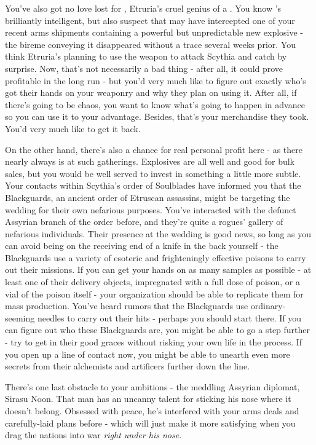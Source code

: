 \documentclass[char]{Kos}
\begin{document}
You've also got no love lost for \cEtruriaKing{}, Etruria's cruel genius of a \cEtruriaKing{\monarch}. You know \cEtruriaKing{\they}'s brilliantly intelligent, but also suspect that \cEtruriaKing{\they} may have intercepted one of your recent arms shipments containing a powerful but unpredictable new explosive - the bireme conveying it disappeared without a trace several weeks prior. You think Etruria's planning to use the weapon to attack Scythia and catch \cScythiaKing{} by surprise. Now, that's not necessarily a bad thing - after all, it could prove profitable in the long run - but you'd very much like to figure out exactly who's got their hands on your weaponry and why they plan on using it. After all, if there's going to be chaos, you want to know what's going to happen in advance so you can use it to your advantage. Besides, that's your merchandise they took. You'd very much like to get it back.

On the other hand, there's also a chance for real personal profit here - as there nearly always is at such gatherings. Explosives are all well and good for bulk sales, but you would be well served to invest in something a little more subtle. Your contacts within Scythia's order of Soulblades have informed you that the Blackguards, an ancient order of Etruscan assassins, might be targeting the wedding for their own nefarious purposes. You've interacted with the defunct Assyrian branch of the order before, and they're quite a rogues' gallery of nefarious individuals. Their presence at the wedding is good news, so long as you can avoid being on the receiving end of a knife in the back yourself - the Blackguards use a variety of esoteric and frighteningly effective poisons to carry out their missions. If you can get your hands on as many samples as possible - at least one of their delivery objects, impregnated with a full dose of poison, or a vial of the poison itself - your organization should be able to replicate them for mass production. You've heard rumors that the Blackguards use ordinary-seeming needles to carry out their hits - perhaps you should start there. If you can figure out who these Blackguards are, you might be able to go a step further - try to get in their good graces without risking your own life in the process. If you open up a line of contact now, you might be able to unearth even more secrets from their alchemists and artificers further down the line.

There's one last obstacle to your ambitions - the meddling Assyrian diplomat, Sirasu Noon. That man has an uncanny talent for sticking his nose where it doesn't belong. Obsessed with peace, he's interfered with your arms deals and carefully-laid plans before - which will just make it more satisfying when you drag the nations into war \emph{right under his nose}.
\end{document}
